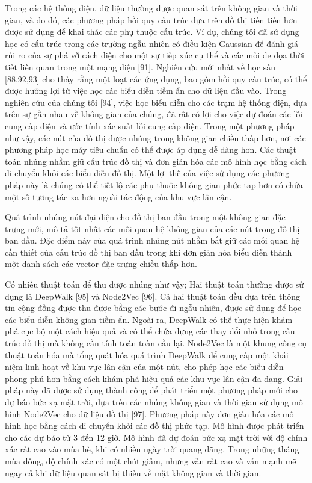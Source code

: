 \documentclass[utf8]{frontiersSCNS} %
\begin{document}
Trong các hệ thống điện, dữ liệu thường được quan sát trên không gian và thời gian, và do đó, các phương pháp hồi quy cấu trúc dựa trên đồ thị tiên tiến hơn được sử dụng để khai thác các phụ thuộc cấu trúc. Ví dụ, chúng tôi đã sử dụng học có cấu trúc trong các trường ngẫu nhiên có điều kiện Gaussian để đánh giá rủi ro của sự phá vỡ cách điện cho một sự tiếp xúc cụ thể và các mối đe dọa thời tiết liên quan trong một mạng điện [91]. Nghiên cứu mới nhất về học sâu [88,92,93] cho thấy rằng một loạt các ứng dụng, bao gồm hồi quy cấu trúc, có thể được hưởng lợi từ việc học các biểu diễn tiềm ẩn cho dữ liệu đầu vào. Trong nghiên cứu của chúng tôi [94], việc học biểu diễn cho các trạm hệ thống điện, dựa trên sự gần nhau về không gian của chúng, đã rất có lợi cho việc dự đoán các lỗi cung cấp điện và ước tính xác suất lỗi cung cấp điện. Trong một phương pháp như vậy, các nút của đồ thị được nhúng trong không gian chiều thấp hơn, nơi các phương pháp học máy tiêu chuẩn có thể được áp dụng dễ dàng hơn. Các thuật toán nhúng nhằm giữ cấu trúc đồ thị và đơn giản hóa các mô hình học bằng cách di chuyển khỏi các biểu diễn đồ thị. Một lợi thế của việc sử dụng các phương pháp này là chúng có thể tiết lộ các phụ thuộc không gian phức tạp hơn có chứa một số tương tác xa hơn ngoài tác động của khu vực lân cận.

Quá trình nhúng nút đại diện cho đồ thị ban đầu trong một không gian đặc trưng mới, mô tả tốt nhất các mối quan hệ không gian của các nút trong đồ thị ban đầu. Đặc điểm này của quá trình nhúng nút nhằm bắt giữ các mối quan hệ cần thiết của cấu trúc đồ thị ban đầu trong khi đơn giản hóa biểu diễn thành một danh sách các vector đặc trưng chiều thấp hơn.

Có nhiều thuật toán để thu được nhúng như vậy; Hai thuật toán thường được sử dụng là DeepWalk [95] và Node2Vec [96]. Cả hai thuật toán đều dựa trên thông tin cộng đồng được thu được bằng các bước đi ngẫu nhiên, được sử dụng để học các biểu diễn không gian tiềm ẩn. Ngoài ra, DeepWalk có thể thực hiện khám phá cục bộ một cách hiệu quả và có thể chứa đựng các thay đổi nhỏ trong cấu trúc đồ thị mà không cần tính toán toàn cầu lại. Node2Vec là một khung công cụ thuật toán hóa mà tổng quát hóa quá trình DeepWalk để cung cấp một khái niệm linh hoạt về khu vực lân cận của một nút, cho phép học các biểu diễn phong phú hơn bằng cách khám phá hiệu quả các khu vực lân cận đa dạng. Giải pháp này đã được sử dụng thành công để phát triển một phương pháp mới cho dự báo bức xạ mặt trời, dựa trên các nhúng không gian và thời gian sử dụng mô hình Node2Vec cho dữ liệu đồ thị [97]. Phương pháp này đơn giản hóa các mô hình học bằng cách di chuyển khỏi các đồ thị phức tạp. Mô hình được phát triển cho các dự báo từ 3 đến 12 giờ. Mô hình đã dự đoán bức xạ mặt trời với độ chính xác rất cao vào mùa hè, khi có nhiều ngày trời quang đãng. Trong những tháng mùa đông, độ chính xác có một chút giảm, nhưng vẫn rất cao và vẫn mạnh mẽ ngay cả khi dữ liệu quan sát bị thiếu về mặt không gian và thời gian.
\end{document}
